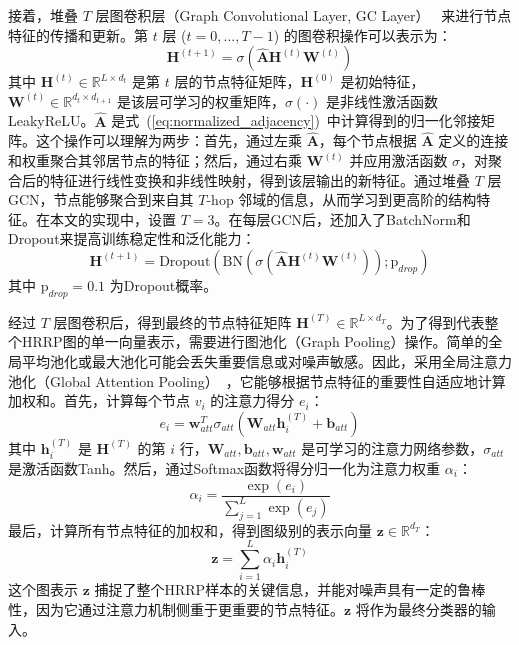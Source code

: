 接着，堆叠 $T$ 层图卷积层（Graph Convolutional Layer, GC Layer）~\cite{kipf_semi-supervised_2017} 来进行节点特征的传播和更新。第 $t$ 层 ($t=0, \dots, T-1$) 的图卷积操作可以表示为：
\begin{equation}
    \mathbf{H}^{(t+1)} = \sigma\left(\hat{\mathbf{A}} \mathbf{H}^{(t)} \mathbf{W}^{(t)}\right)
    \label{eq:gcn_layer}
\end{equation}
其中 $\mathbf{H}^{(t)} \in \mathbb{R}^{L \times d_t}$ 是第 $t$ 层的节点特征矩阵，$\mathbf{H}^{(0)}$ 是初始特征，$\mathbf{W}^{(t)} \in \mathbb{R}^{d_t \times d_{t+1}}$ 是该层可学习的权重矩阵，$\sigma(\cdot)$ 是非线性激活函数LeakyReLU。$\hat{\mathbf{A}}$ 是式~(\ref{eq:normalized_adjacency})~中计算得到的归一化邻接矩阵。这个操作可以理解为两步：首先，通过左乘 $\hat{\mathbf{A}}$，每个节点根据 $\hat{\mathbf{A}}$ 定义的连接和权重聚合其邻居节点的特征；然后，通过右乘 $\mathbf{W}^{(t)}$ 并应用激活函数 $\sigma$，对聚合后的特征进行线性变换和非线性映射，得到该层输出的新特征。通过堆叠 $T$ 层GCN，节点能够聚合到来自其 $T$-hop 邻域的信息，从而学习到更高阶的结构特征。在本文的实现中，设置 $T=3$。在每层GCN后，还加入了BatchNorm和Dropout来提高训练稳定性和泛化能力：
\begin{equation}
    \mathbf{H}^{(t+1)} = \text{Dropout}\left(\text{BN}\left(\sigma\left(\hat{\mathbf{A}} \mathbf{H}^{(t)} \mathbf{W}^{(t)}\right)\right); \text{p}_{drop}\right)
    \label{eq:gcn_layer_full}
\end{equation}
其中 $\text{p}_{drop}=0.1$ 为Dropout概率。

经过 $T$ 层图卷积后，得到最终的节点特征矩阵 $\mathbf{H}^{(T)} \in \mathbb{R}^{L \times d_T}$。为了得到代表整个HRRP图的单一向量表示，需要进行图池化（Graph Pooling）操作。简单的全局平均池化或最大池化可能会丢失重要信息或对噪声敏感。因此，采用全局注意力池化（Global Attention Pooling）~，它能够根据节点特征的重要性自适应地计算加权和。首先，计算每个节点 $v_i$ 的注意力得分 $e_i$：
\begin{equation}
    e_i = \mathbf{w}_{att}^T \sigma_{att}(\mathbf{W}_{att} \mathbf{h}_i^{(T)} + \mathbf{b}_{att})
    \label{eq:attention_score_node}
\end{equation}
其中 $\mathbf{h}_i^{(T)}$ 是 $\mathbf{H}^{(T)}$ 的第 $i$ 行，$\mathbf{W}_{att}, \mathbf{b}_{att}, \mathbf{w}_{att}$ 是可学习的注意力网络参数，$\sigma_{att}$ 是激活函数Tanh。然后，通过Softmax函数将得分归一化为注意力权重 $\alpha_i$：
\begin{equation}
    \alpha_i = \frac{\exp(e_i)}{\sum_{j=1}^L \exp(e_j)}
    \label{eq:attention_weight_node}
\end{equation}
最后，计算所有节点特征的加权和，得到图级别的表示向量 $\mathbf{z} \in \mathbb{R}^{d_T}$：
\begin{equation}
    \mathbf{z} = \sum_{i=1}^L \alpha_i \mathbf{h}_i^{(T)}
    \label{eq:graph_representation}
\end{equation}
这个图表示 $\mathbf{z}$ 捕捉了整个HRRP样本的关键信息，并能对噪声具有一定的鲁棒性，因为它通过注意力机制侧重于更重要的节点特征。$\mathbf{z}$ 将作为最终分类器的输入。

